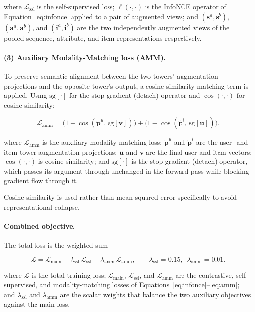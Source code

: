 where $\mathcal{L}_{\text{ssl}}$ is the self-supervised loss; $\ell(\cdot,\cdot)$ is the InfoNCE operator of Equation~\eqref{eq:infonce} applied to a pair of augmented views; and $(\mathbf{s}^a,\mathbf{s}^b)$, $(\mathbf{a}^a,\mathbf{a}^b)$, and $(\mathbf{i}^a,\mathbf{i}^b)$ are the two independently augmented views of the pooled-sequence, attribute, and item representations respectively.

\paragraph{(3) Auxiliary Modality-Matching loss (AMM).} To preserve semantic alignment between the two towers' augmentation projections and the opposite tower's output, a cosine-similarity matching term is applied. Using $\mathrm{sg}[\cdot]$ for the stop-gradient (detach) operator and $\cos(\cdot,\cdot)$ for cosine similarity:

\begin{equation}
\mathcal{L}_{\text{amm}}
= \big(1-\cos(\tilde{\mathbf{p}}^{u},\,\mathrm{sg}[\mathbf{v}])\big)
+ \big(1-\cos(\tilde{\mathbf{p}}^{i},\,\mathrm{sg}[\mathbf{u}])\big).
\label{eq:amm}
\end{equation}

where $\mathcal{L}_{\text{amm}}$ is the auxiliary modality-matching loss; $\tilde{\mathbf{p}}^{u}$ and $\tilde{\mathbf{p}}^{i}$ are the user- and item-tower augmentation projections; $\mathbf{u}$ and $\mathbf{v}$ are the final user and item vectors; $\cos(\cdot,\cdot)$ is cosine similarity; and $\mathrm{sg}[\cdot]$ is the stop-gradient (detach) operator, which passes its argument through unchanged in the forward pass while blocking gradient flow through it.

Cosine similarity is used rather than mean-squared error specifically to avoid representational collapse.

\paragraph{Combined objective.} The total loss is the weighted sum

\begin{equation}
\mathcal{L}
= \mathcal{L}_{\text{main}}
+ \lambda_{\text{ssl}}\,\mathcal{L}_{\text{ssl}}
+ \lambda_{\text{amm}}\,\mathcal{L}_{\text{amm}},
\qquad
\lambda_{\text{ssl}} = 0.15,\;\; \lambda_{\text{amm}} = 0.01 .
\label{eq:total_loss}
\end{equation}

where $\mathcal{L}$ is the total training loss; $\mathcal{L}_{\text{main}}$, $\mathcal{L}_{\text{ssl}}$, and $\mathcal{L}_{\text{amm}}$ are the contrastive, self-supervised, and modality-matching losses of Equations~\eqref{eq:infonce}--\eqref{eq:amm}; and $\lambda_{\text{ssl}}$ and $\lambda_{\text{amm}}$ are the scalar weights that balance the two auxiliary objectives against the main loss.

